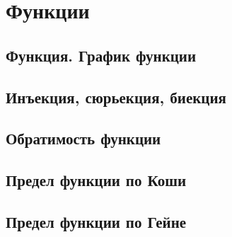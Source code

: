 \section{Функции}
\subsection{Функция. График функции}
\subsection{Инъекция, сюрьекция, биекция} 
\subsection{Обратимость функции}
\subsection{Предел функции по Коши}
\subsection{Предел функции по Гейне}
